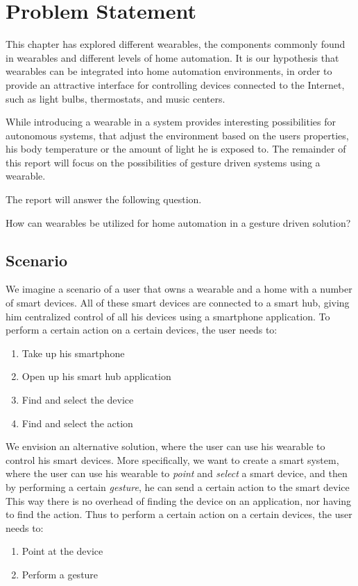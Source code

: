 \section{Problem Statement}\label{sec:researchstatement}
This chapter has explored different wearables, 
the components commonly found in wearables and different levels of home automation. 
It is our hypothesis that wearables can be integrated into home automation environments, 
in order to provide an attractive interface for controlling devices connected to the Internet, 
such as light bulbs, thermostats, and music centers.

While introducing a wearable in a system provides interesting possibilities for autonomous systems, 
that adjust the environment based on the users properties, 
\eg his body temperature or the amount of light he is exposed to. 
The remainder of this report will focus on the possibilities of gesture driven systems using a wearable.

The report will answer the following question.

\begin{framed}
      How can wearables be utilized for home automation in a gesture driven solution?
\end{framed}

\subsection{Scenario}
We imagine a scenario of a user that owns a wearable and a home with a number of smart devices. 
All of these smart devices are connected to a smart hub, 
giving him centralized control of all his devices using \eg a smartphone application.
To perform a certain action on a certain devices, the user needs to:
\begin{enumerate}
  \item Take up his smartphone
  \item Open up his smart hub application
  \item Find and select the device
  \item Find and select the action
\end{enumerate}

We envision an alternative solution, 
where the user can use his wearable to control his smart devices. 
More specifically, we want to create a smart system, 
where the user can use his wearable to \emph{point} and \emph{select} a smart device, 
and then by performing a certain \emph{gesture}, he can send a certain action to the smart device
This way there is no overhead of finding the device on an application, 
nor having to find the action. 
Thus to perform a certain action on a certain devices, the user needs to:
\begin{enumerate}
  \item Point at the device
  \item Perform a gesture
\end{enumerate}

